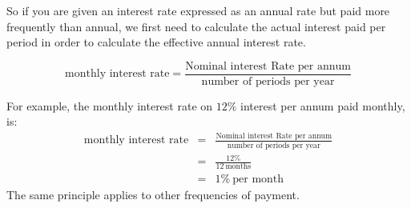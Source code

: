 So if you are given an interest rate expressed as an annual rate but paid more frequently than annual, we first need to calculate the actual interest paid per period in order to calculate the effective annual interest rate.

\begin{equation}
\mbox{monthly interest rate}=\frac{\mbox{Nominal interest Rate per annum}}{\mbox{number of periods per year}}
\end{equation}

For example, the monthly interest rate on $12\%$ interest per annum paid monthly, is:
\begin{eqnarray*}
\mbox{monthly interest rate}&=&\frac{\mbox{Nominal interest Rate per annum}}{\mbox{number of periods per year}}\\
&=& \frac{12\%}{12~\mbox{months}}\\
&=& 1\%~\mbox{per month}
\end{eqnarray*}
The same principle applies to other frequencies of payment.

